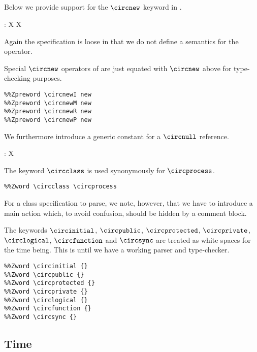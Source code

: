 \subsection{{\OhCircus}}


Below we provide support for the $\circnew$ keyword in {\OhCircus}.
%
\begin{gendef}[X]
  \circnew : \power X \fun \circreftype X
\end{gendef}
%
Again the specification is loose in that we do not define a semantics for the operator.

Special $\circnew$ operators of {\SCJCircus} are just equated with $\circnew$ above for type-checking purposes.

\begin{verbatim}
%%Zpreword \circnewI new
%%Zpreword \circnewM new
%%Zpreword \circnewR new
%%Zpreword \circnewP new
\end{verbatim}


\nid We furthermore introduce a generic constant for a $\circnull$ reference.
%
\begin{gendef}[X]
  \circnull : \circreftype X
\end{gendef}
%
The {\OhCircus} keyword $\circclass$ is used synonymously for $\circprocess$.

\begin{verbatim}
%%Zword \circclass \circprocess
\end{verbatim}
%
For a class specification to parse, we note, however, that we have to introduce a main action which, to avoid confusion, should be hidden by a comment block.

The keywords $\circinitial$, $\circpublic$, $\circprotected$, $\circprivate$, $\circlogical$, $\circfunction$ and $\circsync$ are treated as white spaces for the time being. This is until we have a working {\OhCircus} parser and type-checker.

\begin{verbatim}
%%Zword \circinitial {}
%%Zword \circpublic {}
%%Zword \circprotected {}
%%Zword \circprivate {}
%%Zword \circlogical {}
%%Zword \circfunction {}
%%Zword \circsync {}
\end{verbatim}

\subsection{{\Circus} Time}

